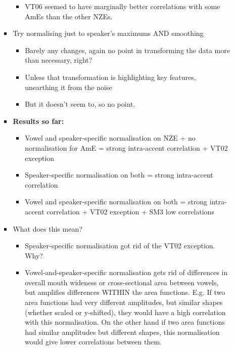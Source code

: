 \documentclass{article}
\begin{document}
\begin{itemize}
\begin{itemize}
\begin{itemize}
\begin{itemize}
                \item VT06 seemed to have marginally better correlations with some AmEs than the other NZEs.
            \end{itemize}
            \item Try normalising just to speaker's maximums AND smoothing
            \begin{itemize}
                \item Barely any changes, again no point in transforming the data more than necessary, right?
                \item Unless that transformation is highlighting key features, unearthing it from the noise
                \item But it doesn't seem to, so no point.
            \end{itemize}
            \item \textbf{Results so far:}
            \begin{itemize}
                \item Vowel and speaker-specific normalisation on NZE + no normalisation for AmE = strong intra-accent correlation + VT02 exception
                \item Speaker-specific normalisation on both = strong intra-accent correlation
                \item Vowel and speaker-specific normalisation on both = strong intra-accent correlation + VT02 exception + SM3 low correlations
            \end{itemize}
            \item What does this mean?
            \begin{itemize}
                \item Speaker-specific normalisation got rid of the VT02 exception. Why?
                \item Vowel-and-speaker-specific normalisation gets rid of differences in overall mouth wideness or cross-sectional area between vowels, but amplifies differences WITHIN the area functions. E.g. If two area functions had very different amplitudes, but similar shapes (whether scaled or y-shifted), they would have a high correlation with this normalisation. On the other hand if two area functions had similar amplitudes but different shapes, this normalisation would give lower correlations between them.

\end{itemize}
\end{itemize}
\end{itemize}
\end{itemize}
\end{document}
